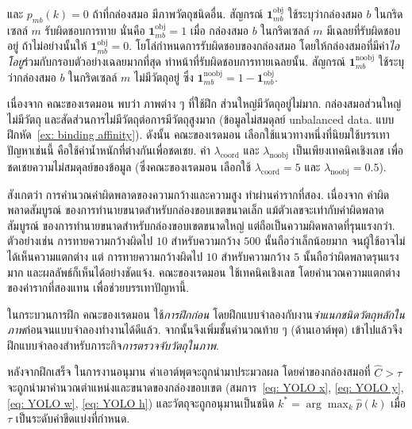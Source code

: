 และ $p_{mb}(k) = 0$ ถ้าที่กล่องสมอ มีภาพวัตถุชนิดอื่น.
สัญกรณ์ $\bm{1}_{mb}^{\mathrm{obj}}$ ใช้ระบุว่ากล่องสมอ $b$ ในกริดเซลล์ $m$ รับผิดชอบการทาย
นั่นคือ $\bm{1}_{mb}^{\mathrm{obj}} = 1$ เมื่อ กล่องสมอ $b$ ในกริดเซลล์ $m$ มีเฉลยที่รับผิดชอบอยู่
ถ้าไม่อย่างนั้นให้ $\bm{1}_{mb}^{\mathrm{obj}} = 0$.
โยโล่กำหนดการรับผิดชอบของกล่องสมอ
โดยให้กล่องสมอที่มีค่า\textit{ไอโอยู}ร่วมกับกรอบตัวอย่างเฉลยมากที่สุด ทำหน้าที่รับผิดชอบการทายเฉลยนั้น. 
สัญกรณ์ $\bm{1}_{mb}^{\mathrm{noobj}}$ ใช้ระบุว่ากล่องสมอ $b$ ในกริดเซลล์ $m$ ไม่มีวัตถุอยู่
ซึ่ง $\bm{1}_{mb}^{\mathrm{noobj}} = 1 - \bm{1}_{mb}^{\mathrm{obj}}$.

เนื่องจาก คณะของเรดมอน\cite{YOLO1} พบว่า ภาพต่าง ๆ ที่ใช้ฝึก ส่วนใหญ่มีวัตถุอยู่ไม่มาก.
กล่องสมอส่วนใหญ่ไม่มีวัตถุ และสัดส่วนการไม่มีวัตถุต่อการมีวัตถุสูงมาก (ข้อมูลไม่สมดุลย์ unbalanced data. แบบฝึกหัด~\ref{ex: binding affinity}).
ดังนั้น คณะของเรดมอน เลือกใช้แนวทางหนึ่งที่นิยมใช้บรรเทาปัญหาเช่นนี้ คือใช้ค่าน้ำหนักที่ต่างกันเพื่อชดเชย.
ค่า $\lambda_{\mathrm{coord}}$ และ $\lambda_{\mathrm{noobj}}$ เป็นเพียงเทคนิคเชิงเลข
เพื่อชดเชยความไม่สมดุลย์ของข้อมูล
(ซึ่งคณะของเรดมอน เลือกใช้ $\lambda_{\mathrm{coord}} = 5$ และ $\lambda_{\mathrm{noobj}} = 0.5$).

สังเกตว่า การคำนวณค่าผิดพลาดของความกว้างและความสูง ทำผ่านค่ารากที่สอง.
เนื่องจาก ค่าผิดพลาดสัมบูรณ์ ของการทำนายขนาดสำหรับกล่องขอบเขตขนาดเล็ก
แม้ตัวเลขจะเท่ากับค่าผิดพลาดสัมบูรณ์ ของการทำนายขนาดสำหรับกล่องขอบเขตขนาดใหญ่
แต่ถือเป็นความผิดพลาดที่รุนแรงกว่า.
ตัวอย่างเช่น การทายความกว้างผิดไป $10$ สำหรับความกว้าง $500$ นั้นถือว่าเล็กน้อยมาก จนผู้ใช้อาจไม่ได้เห็นความแตกต่าง
แต่ การทายความกว้างผิดไป $10$ สำหรับความกว้าง $5$ นั้นถือว่าผิดพลาดรุนแรงมาก และผลลัพธ์ก็เห็นได้อย่างชัดแจ้ง.
คณะของเรดมอน\cite{YOLO1} ใช้เทคนิคเชิงเลข โดยคำนวณความแตกต่างของค่ารากที่สองแทน เพื่อช่วยบรรเทาปัญหานี้.

ในกระบวนการฝึก คณะของเรดมอน\cite{YOLO1} ใช้\textit{การฝึกก่อน}
โดยฝึกแบบจำลองกับงาน\textit{จำแนกชนิดวัตถุหลักในภาพ}ก่อนจนแบบจำลองทำงานได้ดีแล้ว.
จากนั้นจึงเพิ่มชั้นคำนวณท้าย ๆ (ด้านเอาต์พุต) เข้าไปแล้วจึงฝึกแบบจำลองสำหรับภาระกิจ\textit{การตรวจจับวัตถุในภาพ}.

หลังจากฝึกเสร็จ ในการงานอนุมาน
ค่าเอาต์พุตจะถูกนำมาประมวลผล 
โดยค่าของกล่องสมอที่ $\hat{C} > \tau$ จะถูกนำมาคำนวณตำแหน่งและขนาดของกล่องขอบเขต (สมการ~\ref{eq: YOLO x}, \ref{eq: YOLO y}, \ref{eq: YOLO w}, \ref{eq: YOLO h})
และวัตถุจะถูกอนุมานเป็นชนิด $k^\ast = \arg\max_k \hat{p}(k)$
เมื่อ $\tau$ เป็นระดับค่าขีดแบ่งที่กำหนด.

